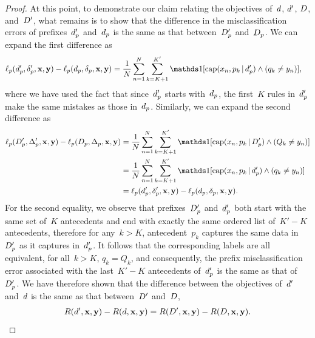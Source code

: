 \begin{proof}
At this point, to demonstrate our claim relating the objectives
of~${d}$, ${d}'$, ${D}$, and~${D}'$, what remains is to
show that the difference in the misclassification errors
of prefixes~$d_p'$ and~$d_p$ is the same as that
between~$D_p'$ and~$D_p$.
%
We can expand the first difference as
\begin{align}
\Loss_p(\Prefix', \Labels', \x, \y) - \Loss_p(\Prefix, \Labels, \x, \y)
&= \frac{1}{N} \sum_{n=1}^N \sum_{k=K+1}^{K'}
\one [ \Cap(x_n, p_k \given \Prefix') \wedge (q_k \neq y_n) ],
\end{align}
where we have used the fact that since~$d_p'$
starts with~$d_p$, the first~$K$ rules in~$d_p'$
make the same mistakes as those in~$d_p$.
%
Similarly, we can expand the second difference as
\begin{align}
\Loss_p(\PrefixB', \LabelsB', \x, \y) - \Loss_p(\PrefixB, \LabelsB, \x, \y)
&= \frac{1}{N} \sum_{n=1}^N \sum_{k=K+1}^{K'}
\one [ \Cap(x_n, p_k \given \PrefixB') \wedge (Q_k \neq y_n) ] \nn \\
&= \frac{1}{N} \sum_{n=1}^N \sum_{k=K+1}^{K'}
\one [ \Cap(x_n, p_k \given \Prefix') \wedge (q_k \neq y_n) ] \nn \\
&= \Loss_p(\Prefix', \Labels', \x, \y) - \Loss_p(\Prefix, \Labels, \x, \y).
\end{align}
For the second equality, we observe that prefixes~$D_p'$
and~$d_p'$ both start with the same set of~$K$ antecedents
and end with exactly the same ordered list of~${K' - K}$ antecedents,
therefore for any~${k > K}$, antecedent~$p_k$ captures the same
data in~$D_p'$ as it captures in~$d_p'$.
%
It follows that the corresponding labels are all equivalent,
\ie for all~${k > K}$, ${q_k = Q_k}$, and consequently,
the prefix misclassification error associated with the
last~${K' - K}$ antecedents of~$d_p'$ is the same
as that of~$D_p'$.
%
We have therefore shown that the difference between the objectives
of~${d}'$ and~${d}$ is the same as that between~${D}'$ and~${D}$, \ie
\begin{align}
\Obj(\RL', \x, \y) - \Obj(\RL, \x, \y)
= \Obj(\RLB', \x, \y) - \Obj(\RLB, \x, \y).
\label{eq:analogous}
\end{align}


\end{proof}
